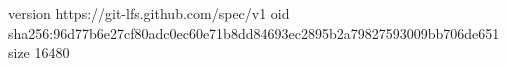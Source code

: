 version https://git-lfs.github.com/spec/v1
oid sha256:96d77b6e27cf80adc0ec60e71b8dd84693ec2895b2a79827593009bb706de651
size 16480
